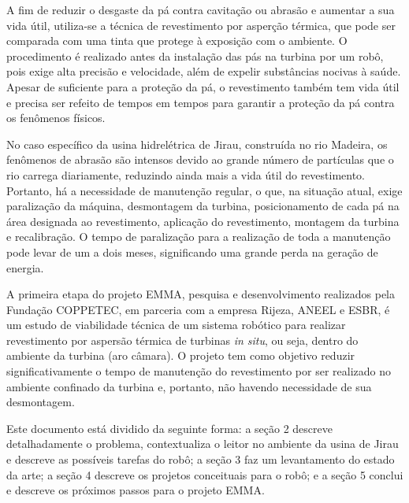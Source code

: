 A fim de reduzir o desgaste da pá contra cavitação ou abrasão e aumentar a sua
vida útil, utiliza-se a técnica de revestimento por asperção térmica, que pode ser comparada com uma
tinta que protege à exposição com o ambiente. O procedimento é realizado
antes da instalação das pás na turbina por um robô, pois exige alta precisão
e velocidade, além de expelir substâncias nocivas à saúde. Apesar de suficiente para a proteção da pá, o
revestimento também tem vida útil e precisa ser refeito de tempos em tempos para
garantir a proteção da pá contra os fenômenos físicos.

No caso específico da usina hidrelétrica de Jirau, construída no rio Madeira,
os fenômenos de abrasão são intensos devido ao grande número
de partículas que o rio carrega diariamente, reduzindo ainda mais a vida útil do
revestimento.
Portanto, há a necessidade de manutenção regular, o que, na situação atual,
exige paralização da máquina, desmontagem da turbina, posicionamento de cada pá
na área designada ao revestimento, aplicação do revestimento, montagem da
turbina e recalibração. O tempo de paralização para a realização de
toda a manutenção pode levar de um a dois meses, significando uma grande perda
na geração de energia. 

A primeira etapa do projeto EMMA, pesquisa e desenvolvimento
realizados pela Fundação COPPETEC, em parceria com a empresa Rijeza, ANEEL e
ESBR, é um estudo de viabilidade técnica de um sistema robótico para realizar
revestimento por aspersão térmica de turbinas \textit{in situ}, ou seja, dentro
do ambiente da turbina (aro câmara). O projeto tem como objetivo reduzir
significativamente o tempo de manutenção do revestimento por ser realizado no
ambiente confinado da turbina e, portanto, não havendo necessidade de sua
desmontagem.

Este documento está dividido da seguinte forma: a seção 2 descreve
detalhadamente o problema, contextualiza o leitor no ambiente da usina de
Jirau e descreve as possíveis tarefas do robô; a seção 3 faz um levantamento do
estado da arte; a seção 4 descreve os projetos conceituais para o robô; e a
seção 5 conclui e descreve os próximos passos para o projeto EMMA. 
